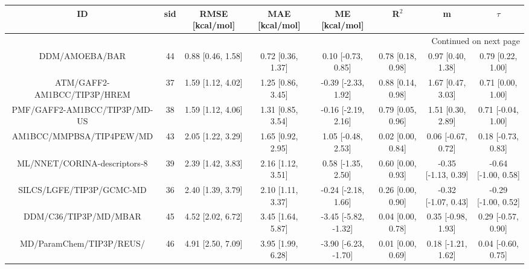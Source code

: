 \documentclass[8pt]{article}
\begin{document}
\begin{center}
\begin{footnotesize}
\begin{longtable}{|cccccccc|}
\toprule
                           ID & sid &    RMSE [kcal/mol] &     MAE [kcal/mol] &         ME [kcal/mol] &              R$^2$ &                    m &               $\tau$ \\
\midrule
\endhead
\midrule
\multicolumn{8}{r}{{Continued on next page}} \\
\midrule
\endfoot

\bottomrule
\endlastfoot
               DDM/AMOEBA/BAR &  44 &  0.88 [0.46, 1.58] &  0.72 [0.36, 1.37] &    0.10 [-0.73, 0.85] &  0.78 [0.18, 0.98] &    0.97 [0.40, 1.38] &    0.79 [0.22, 1.00] \\
  ATM/GAFF2-AM1BCC/TIP3P/HREM &  37 &  1.59 [1.12, 4.02] &  1.25 [0.86, 3.45] &   -0.39 [-2.33, 1.92] &  0.88 [0.14, 0.98] &    1.67 [0.47, 3.03] &    0.71 [0.00, 1.00] \\
 PMF/GAFF2-AM1BCC/TIP3P/MD-US &  38 &  1.59 [1.12, 4.06] &  1.31 [0.85, 3.54] &   -0.16 [-2.19, 2.16] &  0.79 [0.05, 0.96] &    1.51 [0.30, 2.89] &   0.71 [-0.04, 1.00] \\
     AM1BCC/MMPBSA/TIP4PEW/MD &  43 &  2.05 [1.22, 3.29] &  1.65 [0.92, 2.95] &    1.05 [-0.48, 2.53] &  0.02 [0.00, 0.84] &   0.06 [-0.67, 0.72] &   0.18 [-0.73, 0.83] \\
 ML/NNET/CORINA-descriptors-8 &  39 &  2.39 [1.42, 3.83] &  2.16 [1.12, 3.51] &    0.58 [-1.35, 2.50] &  0.60 [0.00, 0.93] &  -0.35 [-1.13, 0.39] &  -0.64 [-1.00, 0.58] \\
     SILCS/LGFE/TIP3P/GCMC-MD &  36 &  2.40 [1.39, 3.79] &  2.10 [1.11, 3.37] &   -0.24 [-2.18, 1.66] &  0.26 [0.00, 0.90] &  -0.32 [-1.07, 0.43] &  -0.29 [-1.00, 0.52] \\
        DDM/C36/TIP3P/MD/MBAR &  45 &  4.52 [2.02, 6.72] &  3.45 [1.64, 5.87] &  -3.45 [-5.82, -1.32] &  0.04 [0.00, 0.78] &   0.35 [-0.98, 1.93] &   0.29 [-0.57, 0.90] \\
     MD/ParamChem/TIP3P/REUS/ &  46 &  4.91 [2.50, 7.09] &  3.95 [1.99, 6.28] &  -3.90 [-6.23, -1.70] &  0.01 [0.00, 0.69] &   0.18 [-1.21, 1.62] &   0.04 [-0.60, 0.75] \\
\end{longtable}
\end{footnotesize}
\end{center}
\end{document}
